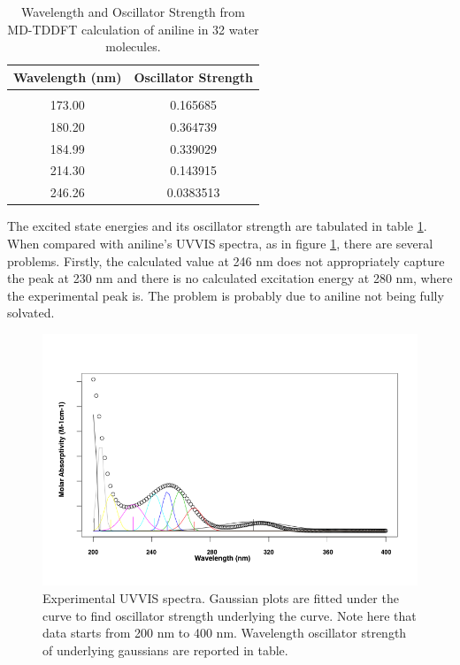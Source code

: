 \documentclass[
journal=jpcbfk, %
manuscript=article]{achemso}
\begin{document}

\begin{table}[ht]
	\caption{Wavelength and Oscillator Strength from MD-TDDFT calculation of aniline in 32 water molecules.}
	\label{table:aniline32TDDFTTable}
	\centering
	\begin{tabular}{c c}
		Wavelength (nm) & Oscillator Strength\\ [1ex] %
		\hline\hline
		\\[-0.5ex]
		173.00&0.165685\\
		180.20&0.364739 \\
		184.99&0.339029\\
		214.30&0.143915\\
		246.26&0.0383513\\ [1ex]
	\end{tabular}
\end{table}

The excited state energies and its oscillator strength are tabulated in table \ref{table:aniline32TDDFTTable}. When compared with aniline's UVVIS spectra, as in figure \ref{fig:UVFromR}, there are several problems. Firstly, the calculated value at 246 nm does not appropriately capture  the peak at 230 nm and there is no calculated excitation energy at 280 nm, where the experimental peak is. The problem is probably due to aniline not being fully solvated. 



\begin{figure}[htb]
	\centering		
	\includegraphics[width=1\textwidth]{UVVISFromR.png}
	\caption{Experimental UVVIS spectra. Gaussian plots are fitted under the curve to find oscillator strength underlying the curve. Note here that data starts from 200 nm to 400 nm. Wavelength oscillator strength of underlying gaussians are reported in table.}
	\label{fig:UVFromR}
\end{figure}
\end{document}
